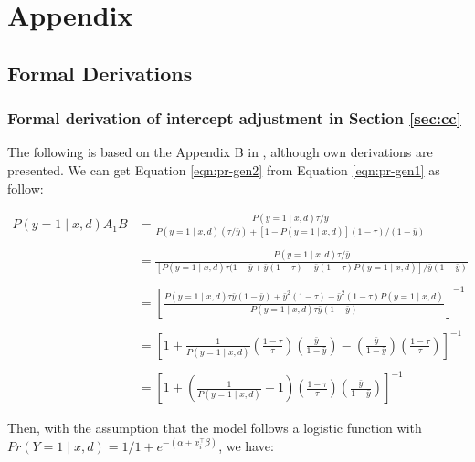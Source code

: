 \section{Appendix}
\subsection{Formal Derivations}

\subsubsection{Formal derivation of intercept adjustment in Section \ref{sec:cc}}
\label{apdx:proof-intercept}

The following is based on the Appendix B in \cite{king2001logistic}, although own derivations are presented. We can get Equation \ref{eqn:pr-gen2} from Equation \ref{eqn:pr-gen1} as follow:

\begin{align*}
    P(y=1 \mid x, d) A_1 B &= \frac{P(y=1 \mid x, d) \tau / \bar{y}}{P(y=1 \mid x, d)(\tau / \bar{y})+[1-P(y=1 \mid x, d)](1-\tau) /(1-\bar{y})}\\
    \\
    &= \frac{P(y=1 \mid x, d) \tau / \bar{y}}{[P(y=1 \mid x, d)\tau(1-\bar{y} + \bar{y}(1-\tau) - \bar{y}(1-\tau)P(y=1 \mid x, d)]/\bar{y}(1-\bar{y})}\\
    \\
    & = \left[\frac{P(y=1 \mid x, d) \tau \bar{y}(1-\bar{y}) + \bar{y}^2(1-\tau) - \bar{y}^2(1-\tau)P(y=1 \mid x, d)}{P(y=1 \mid x, d) \tau \bar{y}(1-\bar{y})}\right]^{-1}\\
    \\
    &= \left[ 1 + \frac{1}{P(y=1 \mid x, d)} \left(\frac{1 - \tau}{\tau}\right) \left(\frac{\bar{y}}{1-\bar{y}}\right) - \left(\frac{\bar{y}}{1-\bar{y}}\right) \left(\frac{1 - \tau}{\tau}\right) \right]^{-1}\\
    \\
    &= \left[ 1 + \left(\frac{1}{P(y=1 \mid x, d)} - 1\right) \left(\frac{1 - \tau}{\tau}\right) \left(\frac{\bar{y}}{1-\bar{y}}\right) \right]^{-1}    
\end{align*}

Then, with the assumption that the model follows a logistic function with $Pr(Y=1 \mid x, d) = 1/1+e^{-(\alpha + x_i^\intercal \beta)}$, we have:

